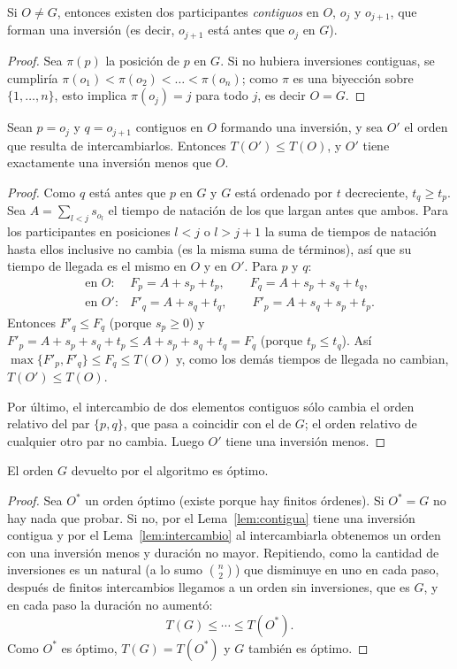 \begin{lema}\label{lem:contigua}
Si $O\neq G$, entonces existen dos participantes \emph{contiguos} en $O$, $o_j$ y $o_{j+1}$, que
forman una inversión (es decir, $o_{j+1}$ está antes que $o_j$ en $G$).
\end{lema}
\begin{proof}
Sea $\pi(p)$ la posición de $p$ en $G$. Si no hubiera inversiones contiguas, se cumpliría
$\pi(o_1)<\pi(o_2)<\dots<\pi(o_n)$; como $\pi$ es una biyección sobre $\{1,\dots,n\}$, esto
implica $\pi(o_j)=j$ para todo $j$, es decir $O=G$.
\end{proof}

\begin{lema}\label{lem:intercambio}
Sean $p=o_j$ y $q=o_{j+1}$ contiguos en $O$ formando una inversión, y sea $O'$ el orden que
resulta de intercambiarlos. Entonces $T(O')\le T(O)$, y $O'$ tiene exactamente una inversión
menos que $O$.
\end{lema}
\begin{proof}
Como $q$ está antes que $p$ en $G$ y $G$ está ordenado por $t$ decreciente, $t_q\ge t_p$. Sea
$A=\sum_{l<j}s_{o_l}$ el tiempo de natación de los que largan antes que ambos.
Para los participantes en posiciones $l<j$ o $l>j+1$ la suma de tiempos de natación hasta ellos
inclusive no cambia (es la misma suma de términos), así que su tiempo de llegada es el mismo en
$O$ y en $O'$. Para $p$ y $q$:
\[
\begin{array}{ll}
\text{en } O: & F_p=A+s_p+t_p,\qquad F_q=A+s_p+s_q+t_q,\\[2pt]
\text{en } O': & F'_q=A+s_q+t_q,\qquad F'_p=A+s_q+s_p+t_p .
\end{array}
\]
Entonces $F'_q\le F_q$ (porque $s_p\ge0$) y $F'_p=A+s_p+s_q+t_p\le A+s_p+s_q+t_q=F_q$ (porque
$t_p\le t_q$). Así $\max\{F'_p,F'_q\}\le F_q\le T(O)$ y, como los demás tiempos de llegada no
cambian, $T(O')\le T(O)$.

Por último, el intercambio de dos elementos contiguos sólo cambia el orden relativo del par
$\{p,q\}$, que pasa a coincidir con el de $G$; el orden relativo de cualquier otro par no cambia.
Luego $O'$ tiene una inversión menos.
\end{proof}

\begin{teorema}
El orden $G$ devuelto por el algoritmo es óptimo.
\end{teorema}
\begin{proof}
Sea $O^*$ un orden óptimo (existe porque hay finitos órdenes). Si $O^*=G$ no hay nada que
probar. Si no, por el Lema~\ref{lem:contigua} tiene una inversión contigua y por el
Lema~\ref{lem:intercambio} al intercambiarla obtenemos un orden con una inversión menos y
duración no mayor. Repitiendo, como la cantidad de inversiones es un natural (a lo sumo
$\binom n2$) que disminuye en uno en cada paso, después de finitos intercambios llegamos a un
orden sin inversiones, que es $G$, y en cada paso la duración no aumentó:
\[
T(G)\le\cdots\le T(O^*).
\]
Como $O^*$ es óptimo, $T(G)=T(O^*)$ y $G$ también es óptimo.
\end{proof}


